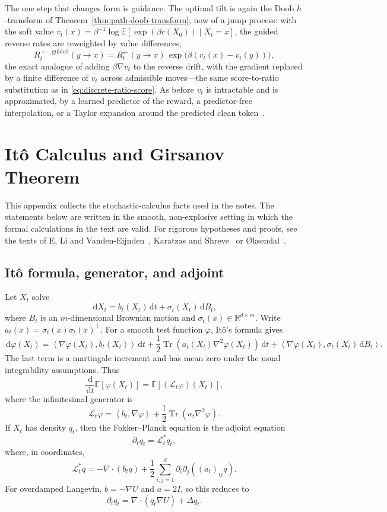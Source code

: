 \documentclass[10pt,a4paper]{amsart}
\numberwithin{equation}{section}
\DeclareMathOperator{\Tr}{Tr}
\newcommand{\R}{\mathbb{R}}
\newcommand{\E}{\mathbb{E}}
\newcommand{\dd}{\,\mathrm{d}}
\newcommand{\Id}{I}
\newcommand{\ip}[2]{\left\langle #1,#2 \right\rangle}
\begin{document}
The one step that changes form is guidance.  The optimal tilt is again the Doob
$h$-transform of Theorem~\ref{thm:path-doob-transform}, now of a jump process:
with the soft value $v_t(x)=\beta^{-1}\log\E[\exp(\beta r(X_0))\mid X_t=x]$, the
guided reverse rates are reweighted by value differences,
\[
    R_t^{\leftarrow,\mathrm{guided}}(y\to x)
    =R_t^{\leftarrow}(y\to x)\,\exp\!\big(\beta(v_t(x)-v_t(y))\big),
\]
the exact analogue of adding $\beta\nabla v_t$ to the reverse drift, with the gradient
replaced by a finite difference of $v_t$ across admissible moves---the same
score-to-ratio substitution as in \eqref{eq:discrete-ratio-score}.  As before
$v_t$ is intractable and is approximated, by a learned predictor of the reward,
a predictor-free interpolation, or a Taylor expansion around the predicted clean
token~\cite{nisonoff2024discreteguidance}.

\appendix

\section{It\^o Calculus and Girsanov Theorem}\label{app:ito-girsanov}

This appendix collects the stochastic-calculus facts used in the notes.  The
statements below are written in the smooth, non-explosive setting in which the
formal calculations in the text are valid.  For rigorous hypotheses and
proofs, see the texts of E, Li and Vanden-Eijnden~\cite{e2019appliedstochastic}, Karatzas and Shreve~\cite{karatzas1991brownian}
or {\O}ksendal~\cite{oksendal2003stochastic}.

\subsection*{It\^o formula, generator, and adjoint}

Let $X_t$ solve
\[
    \dd X_t=b_t(X_t)\dd t+\sigma_t(X_t)\dd B_t,
\]
where $B_t$ is an $m$-dimensional Brownian motion and
$\sigma_t(x)\in\R^{d\times m}$.  Write
$a_t(x)=\sigma_t(x)\sigma_t(x)^\top$.  For a smooth test function $\varphi$,
It\^o's formula gives
\[
    \dd\varphi(X_t)
    =
    \ip{\nabla\varphi(X_t)}{b_t(X_t)}\dd t
    +\frac12\Tr\!\left(a_t(X_t)\nabla^2\varphi(X_t)\right)\dd t
    +\ip{\nabla\varphi(X_t)}{\sigma_t(X_t)\dd B_t}.
\]
The last term is a martingale increment and has mean zero under the usual
integrability assumptions.  Thus
\[
    \frac{\dd}{\dd t}\E[\varphi(X_t)]
    =
    \E[(\mathcal L_t\varphi)(X_t)],
\]
where the infinitesimal generator is
\[
    \mathcal L_t\varphi
    =
    \ip{b_t}{\nabla\varphi}
    +\frac12\Tr(a_t\nabla^2\varphi).
\]
If $X_t$ has density $q_t$, then the Fokker--Planck equation is the adjoint
equation
\[
    \partial_tq_t=\mathcal L_t^\ast q_t,
\]
where, in coordinates,
\[
    \mathcal L_t^\ast q
    =
    -\nabla\cdot(b_tq)
    +\frac12\sum_{i,j=1}^d
    \partial_i\partial_j\!\left((a_t)_{ij}q\right).
\]
For overdamped Langevin, $b=-\nabla U$ and $a=2\Id$, so this reduces to
\[
    \partial_tq_t=\nabla\cdot(q_t\nabla U)+\Delta q_t.
\]
\end{document}

